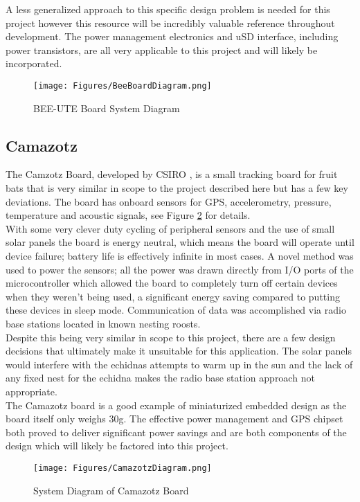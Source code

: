 \documentclass[12pt,openany,a4paper]{book}
\begin{document}
			  A less generalized approach to this specific design problem is needed for this project however this resource will be incredibly valuable reference throughout development. The power management electronics and uSD interface, including power transistors, are all very applicable to this project and will likely be incorporated.
			\begin{figure}[H]
				\centering
				\texttt{[image: Figures/BeeBoardDiagram.png]}
				\caption{BEE-UTE Board System Diagram}
				\label{fig:BEE}
			\end{figure}
			
		\subsection{Camazotz}
			The Camzotz Board, developed by CSIRO \cite{Jurdak13}, is a small tracking board for fruit bats that is very similar in scope to the project described here but has a few key deviations. The board has onboard sensors for GPS, accelerometry, pressure, temperature and acoustic signals, see Figure \ref{fig:Camazotz} for details. \\
			
			With some very clever duty cycling of peripheral sensors and the use of small solar panels the board is energy neutral, which means the board will operate until device failure; battery life is effectively infinite in most cases. A novel method was used to power the sensors; all the power was drawn directly from I/O ports of the microcontroller which allowed the board to completely turn off certain devices when they weren't being used, a significant energy saving compared to putting these devices in sleep mode. Communication of data was accomplished via radio base stations located in known nesting roosts. \\
			
			Despite this being very similar in scope to this project, there are a few design decisions that ultimately make it unsuitable for this application. The solar panels would interfere with the echidnas attempts to warm up in the sun and the lack of any fixed nest for the echidna makes the radio base station approach not appropriate. \\
			
			The Camazotz board is a good example of miniaturized embedded design as the board itself only weighs 30g. The effective power management and GPS chipset both proved to deliver significant power savings and are both components of the design which will likely be factored into this project. 
			\begin{figure}[H]
				\centering
				\texttt{[image: Figures/CamazotzDiagram.png]}
				\caption{System Diagram of Camazotz Board}
				\label{fig:Camazotz}
			\end{figure}		
\end{document}
